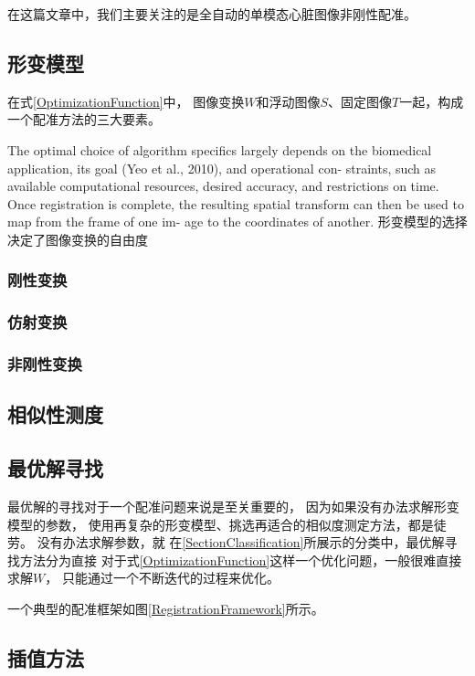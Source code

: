 在这篇文章中，我们主要关注的是全自动的单模态心脏图像非刚性配准。

\subsection{形变模型}\label{SectionTransformation}
在式\ref{OptimizationFunction}中，
图像变换$W$和浮动图像$S$、固定图像$T$一起，构成一个配准方法的三大要素。

The optimal choice of algorithm specifics largely depends on the
biomedical application, its goal (Yeo et al., 2010), and operational con-
straints, such as available computational resources, desired accuracy,
and restrictions on time. Once registration is complete, the resulting
spatial transform can then be used to map from the frame of one im-
age to the coordinates of another.
形变模型的选择决定了图像变换的自由度
\subsubsection{刚性变换}
\subsubsection{仿射变换}
\subsubsection{非刚性变换}

\subsection{相似性测度}\label{SectionMetric}


\subsection{最优解寻找}\label{SectionOptimization}
最优解的寻找对于一个配准问题来说是至关重要的，
因为如果没有办法求解形变模型的参数，
使用再复杂的形变模型、挑选再适合的相似度测定方法，都是徒劳。
没有办法求解参数，就
在\ref{SectionClassification}所展示的分类中，最优解寻找方法分为直接
对于式\ref{OptimizationFunction}这样一个优化问题，一般很难直接求解$W$，
只能通过一个不断迭代的过程来优化。

一个典型的配准框架如图\ref{RegistrationFramework}所示。

\subsection{插值方法}\label{SectionModality}

